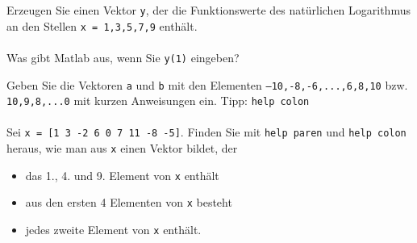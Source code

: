     \secMexercise
    \begin{frame}
      \frameMexercise
      \begin{exercise}
          \sloppy
          Erzeugen Sie einen Vektor \texttt{y}, der die Funktionswerte des natürlichen Logarithmus an den Stellen
          \texttt{x = 1,3,5,7,9} enthält. \\ \\

          Was gibt Matlab aus, wenn Sie \texttt{y(1)} eingeben?
      \end{exercise}
    \end{frame}

    \secMexercise
    \begin{frame}
      \frameMexercise
      \begin{exercise}
          \sloppy
          Geben Sie die Vektoren \texttt{a} und \texttt{b} mit den Elementen
          \texttt{–10,-8,-6,...,6,8,10} bzw. \texttt{10,9,8,...0} mit kurzen Anweisungen ein.
          \alert{Tipp}: \texttt{help colon} \\ \\

          Sei \texttt{x = [1 3 -2 6 0 7 11 -8 -5]}. Finden Sie mit
          \texttt{help paren} und \texttt{help colon} heraus, wie man aus \texttt{x} einen Vektor bildet, der

          \begin{itemize}
              \item das 1., 4. und 9. Element von \texttt{x} enthält
              \item aus den ersten 4 Elementen von \texttt{x} besteht
              \item jedes zweite Element von \texttt{x} enthält.
          \end{itemize}
      \end{exercise}
    \end{frame}

